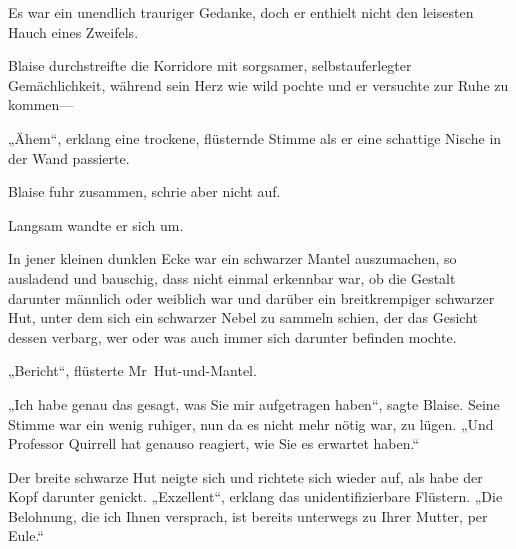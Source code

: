 Es war ein unendlich trauriger Gedanke, doch er enthielt nicht den leisesten Hauch eines Zweifels.


Blaise durchstreifte die Korridore mit sorgsamer, selbstauferlegter Gemächlichkeit, während sein Herz wie wild pochte und er versuchte zur Ruhe zu kommen—

„Ähem“, erklang eine trockene, flüsternde Stimme als er eine schattige Nische in der Wand passierte.

Blaise fuhr zusammen, schrie aber nicht auf.

Langsam wandte er sich um.

In jener kleinen dunklen Ecke war ein schwarzer Mantel auszumachen, so ausladend und bauschig, dass nicht einmal erkennbar war, ob die Gestalt darunter männlich oder weiblich war und darüber ein breitkrempiger schwarzer Hut, unter dem sich ein schwarzer Nebel zu sammeln schien, der das Gesicht dessen verbarg, wer oder was auch immer sich darunter befinden mochte.

„Bericht“, flüsterte Mr~Hut-und-Mantel.

„Ich habe genau das gesagt, was Sie mir aufgetragen haben“, sagte Blaise. Seine Stimme war ein wenig ruhiger, nun da es nicht mehr nötig war, zu lügen.
„Und Professor Quirrell hat genauso reagiert, wie Sie es erwartet haben.“

Der breite schwarze Hut neigte sich und richtete sich wieder auf, als habe der Kopf darunter genickt.
„Exzellent“, erklang das unidentifizierbare Flüstern.
„Die Belohnung, die ich Ihnen versprach, ist bereits unterwegs zu Ihrer Mutter, per Eule.“

